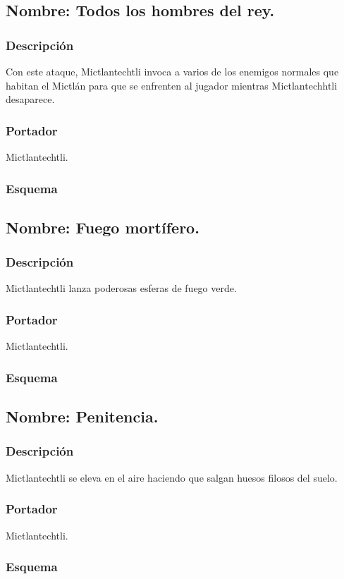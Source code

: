\documentclass[11pt,letterpaper]{article}
\begin{document}
\subsection{Nombre: Todos los hombres del rey.}
\subsubsection{Descripción}
Con este ataque,  Mictlantechtli invoca a varios de los enemigos normales que habitan el Mictlán para que se enfrenten al jugador mientras  Mictlantechhtli desaparece.
\subsubsection{Portador}
Mictlantechtli.
\subsubsection{Esquema}
\subsection{Nombre: Fuego mortífero.}
\subsubsection{Descripción}
Mictlantechtli  lanza poderosas esferas de fuego verde.
\subsubsection{Portador}
Mictlantechtli.	
\subsubsection{Esquema}	
\subsection{Nombre: Penitencia.}
\subsubsection{Descripción}
Mictlantechtli se eleva en el aire haciendo que salgan huesos filosos del suelo.
\subsubsection{Portador}
Mictlantechtli.
\subsubsection{Esquema}
\end{document}
